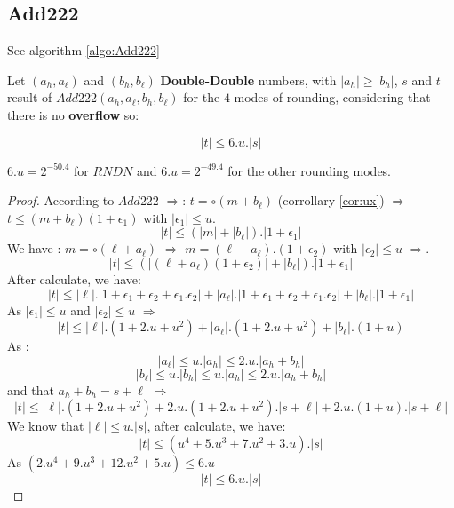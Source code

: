 \subsection{Add222}
See algorithm \ref{algo:Add222}
\begin{lem}[Add222]
Let $(a_h, a_{\ell})$ and $(b_h, b_{\ell})$ \textbf{Double-Double} numbers, with $\lvert a_h \rvert \ge \lvert b_h \rvert$, $s$ and $t$ result of $Add222(a_h,a_{\ell},b_h,b_{\ell})$ for the $4$ modes of rounding, considering that there is no \textbf{overflow} so:

 $$\lvert t \rvert \le 6.u.\lvert s\rvert$$

\end{lem}
$6.u = 2^{-50.4}$ for $RNDN$ and $6.u = 2^{-49.4}$ for the other rounding modes.

\begin{proof} \color{-yellow}
According to $Add222$ $\Rightarrow$:
$t = \circ(m+b_{\ell})$ (corrollary \ref{cor:ux}) $\Rightarrow$ $t \le (m+b_{\ell})(1 +\epsilon_1)$ with $\lvert \epsilon_1 \rvert \le u$.
$$\lvert t \rvert \le (\lvert m \rvert + \lvert b_{\ell} \rvert).\lvert 1 +\epsilon_1 \rvert$$
We have : $m = \circ(\ell + a_{\ell})$ $\Rightarrow$ $m = (\ell+a_{\ell}).(1 +\epsilon_2)$ with $\lvert \epsilon_2 \rvert \le u$ $\Rightarrow$.
$$\lvert t \rvert \le (\lvert (\ell+a_{\ell})(1 +\epsilon_2) \rvert + \lvert b_{\ell} \rvert).\lvert 1 +\epsilon_1 \rvert$$
After calculate, we have:
$$\lvert t \rvert \le \lvert \ell \rvert .\lvert 1 + \epsilon_1 + \epsilon_2 + \epsilon_1.\epsilon_2  \rvert  + \lvert a_{\ell} \rvert .\lvert 1 + \epsilon_1 + \epsilon_2 + \epsilon_1.\epsilon_2  \rvert + \lvert b_{\ell} \rvert.\lvert 1 +\epsilon_1 \rvert$$
As $\lvert \epsilon_1 \rvert \le u$ and $\lvert \epsilon_2  \rvert \le u$ $\Rightarrow$
$$\lvert t \rvert \le \lvert \ell \rvert .( 1 + 2.u + u^2 )  + \lvert a_{\ell} \rvert .( 1 + 2.u + u^2 ) + \lvert b_{\ell} \rvert.( 1+ u)$$
As :
$$ \lvert a_{\ell} \rvert \le u.\lvert a_h \rvert \le 2.u.\lvert a_h + b_h \rvert$$
$$\lvert b_{\ell} \rvert \le u.\lvert b_h \rvert \le u.\lvert a_h \rvert \le 2.u.\lvert a_h + b_h \rvert$$
and that $a_h+b_h = s+\ell$ $\Rightarrow$
$$\lvert t \rvert \le \lvert \ell \rvert .( 1 + 2.u + u^2 )  + 2.u.( 1 + 2.u + u^2 ).\lvert s+ \ell \rvert  + 2.u.( 1+ u).\lvert s+ \ell \rvert$$
We know that $\lvert \ell \rvert \le u.\lvert s \rvert$, after calculate, we have:
$$\lvert t \rvert \le (u^4+5.u^3+7.u^2+3.u).\lvert s\rvert$$
As $(2.u^4+9.u^3+12.u^2+5.u) \le 6.u$
$$\lvert t \rvert \le 6.u.\lvert s\rvert$$

\end{proof}

